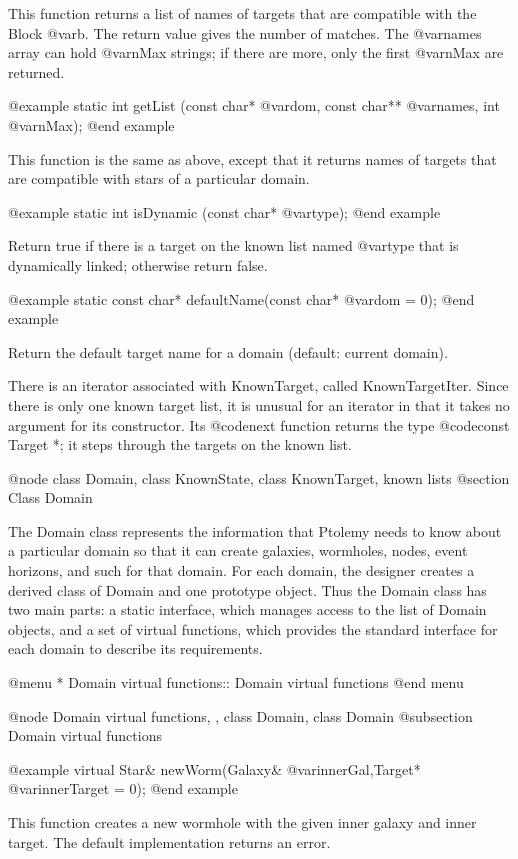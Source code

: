 This function returns a list of names of targets that are compatible
with the Block @var{b}.  The return value gives the number of matches.
The @var{names} array can hold @var{nMax} strings; if there are more,
only the first @var{nMax} are returned.

@example
static int getList (const char* @var{dom}, const char** @var{names}, int @var{nMax});
@end example

This function is the same as above, except that it returns names of
targets that are compatible with stars of a particular domain.

@example
static int isDynamic (const char* @var{type});
@end example

Return true if there is a target on the known list named @var{type}
that is dynamically linked; otherwise return false.

@example
static const char* defaultName(const char* @var{dom} = 0);
@end example

Return the default target name for a domain (default: current domain).

There is an iterator associated with KnownTarget, called
KnownTargetIter.  Since there is only one known target list, it is
unusual for an iterator in that it takes no argument for its constructor.
Its @code{next} function returns the type @code{const Target *}; it
steps through the targets on the known list.

@node class Domain, class KnownState, class KnownTarget, known lists
@section Class Domain

The Domain class represents the information that Ptolemy needs to know
about a particular domain so that it can create galaxies, wormholes,
nodes, event horizons, and such for that domain.  For each domain,
the designer creates a derived class of Domain and one prototype object.
Thus the Domain class has two main parts: a static interface, which
manages access to the list of Domain objects, and a set of virtual
functions, which provides the standard interface for each domain to
describe its requirements.

@menu
* Domain virtual functions::    Domain virtual functions
@end menu

@node Domain virtual functions,  , class Domain, class Domain
@subsection Domain virtual functions

@example
virtual Star& newWorm(Galaxy& @var{innerGal},Target* @var{innerTarget} = 0);
@end example

This function creates a new wormhole with the given inner galaxy and
inner target.  The default implementation returns an error.

